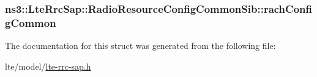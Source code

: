 \subsubsection[{\texorpdfstring{rach\+Config\+Common}{rachConfigCommon}}]{ ns3\+::\+Lte\+Rrc\+Sap\+::\+Radio\+Resource\+Config\+Common\+Sib\+::rach\+Config\+Common}\hypertarget{structns3_1_1LteRrcSap_1_1RadioResourceConfigCommonSib_a2dfc3239500869a1fdafc5f496b28cbb}{}\label{structns3_1_1LteRrcSap_1_1RadioResourceConfigCommonSib_a2dfc3239500869a1fdafc5f496b28cbb}


The documentation for this struct was generated from the following file\+:\begin{DoxyCompactItemize}
\item 
lte/model/\hyperlink{lte-rrc-sap_8h}{lte-\/rrc-\/sap.\+h}\end{DoxyCompactItemize}
